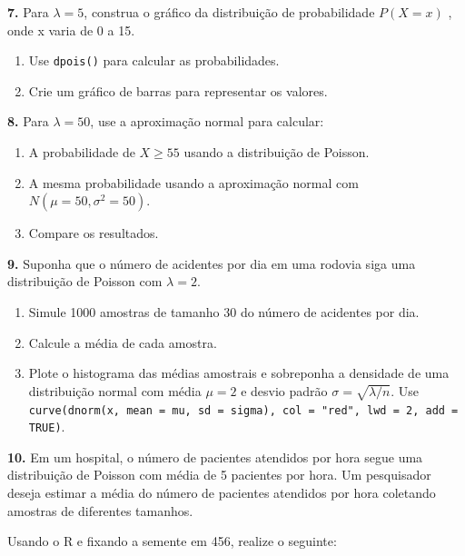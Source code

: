\documentclass[
]{book}
\begin{document}
\textbf{7.} Para \(\lambda = 5\), construa o gráfico da distribuição de probabilidade \(P(X = x)\) , onde x varia de 0 a 15.

\begin{enumerate}
\def\labelenumi{(\alph{enumi})}
\item
  Use \texttt{dpois()} para calcular as probabilidades.
\item
  Crie um gráfico de barras para representar os valores.
\end{enumerate}

\textbf{8.} Para \(\lambda = 50\), use a aproximação normal para calcular:

\begin{enumerate}
\def\labelenumi{(\alph{enumi})}
\item
  A probabilidade de \(X \geq 55\) usando a distribuição de Poisson.
\item
  A mesma probabilidade usando a aproximação normal com \(N(\mu = 50, \sigma^2 = 50)\).
\item
  Compare os resultados.
\end{enumerate}

\textbf{9.} Suponha que o número de acidentes por dia em uma rodovia siga uma distribuição de Poisson com \(\lambda = 2\).

\begin{enumerate}
\def\labelenumi{(\alph{enumi})}
\item
  Simule 1000 amostras de tamanho 30 do número de acidentes por dia.
\item
  Calcule a média de cada amostra.
\item
  Plote o histograma das médias amostrais e sobreponha a densidade de uma distribuição normal com média \(\mu = 2\) e desvio padrão \(\sigma = \sqrt{\lambda / n}\). Use \texttt{curve(dnorm(x,\ mean\ =\ mu,\ sd\ =\ sigma),\ col\ =\ "red",\ lwd\ =\ 2,\ add\ =\ TRUE)}.
\end{enumerate}

\textbf{10.} Em um hospital, o número de pacientes atendidos por hora segue uma distribuição de Poisson com média de 5 pacientes por hora. Um pesquisador deseja estimar a média do número de pacientes atendidos por hora coletando amostras de diferentes tamanhos.

Usando o R e fixando a semente em 456, realize o seguinte:
\end{document}
